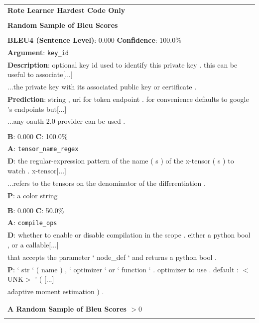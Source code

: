 \begin{table}
\begin{center}
\begin{tabular}{l}

\hline
\textbf{Rote Learner Hardest Code Only}\\
\\
\textbf{Random Sample of Bleu Scores} \\ 
\\
 
\textbf{BLEU4 (Sentence Level)}: 0.000
\textbf{Confidence}: 100.0\%  \\
\textbf{Argument}: \texttt{key_id}\\
\textbf{Description}: optional key id used to identify this private key . this can be useful to associate[...]\\
...the private key with its associated public key or certificate .\\
\textbf{Prediction}: string , uri for token endpoint . for convenience defaults to google 's endpoints but[...]\\
...any oauth 2.0 provider can be used . \\
\\
\textbf{B}: 0.000
\textbf{C}: 100.0\%  \\
\textbf{A}: \texttt{tensor_name_regex}\\
\textbf{D}: the regular-expression pattern of the name ( s ) of the x-tensor ( s ) to watch . x-tensor[...]\\
...refers to the tensors on the denominator of the differentiation .\\
\textbf{P}: a color string \\
\\
\textbf{B}: 0.000
\textbf{C}: 50.0\%  \\
\textbf{A}: \texttt{compile_ops}\\
\textbf{D}: whether to enable or disable compilation in the scope . either a python bool , or a callable[...]\\
 that accepts the parameter ` node\_def ` and returns a python bool .\\
\textbf{P}: ` str ` ( name ) , ` optimizer ` or ` function ` . optimizer to use . default : $<$UNK$>$ ' ( [...]\\
adaptive moment estimation ) . \\
\\
\hline\\
\textbf{A Random Sample of Bleu Scores $>0$ }\\\\ 



\end{tabular}
\end{center}
\end{table}
